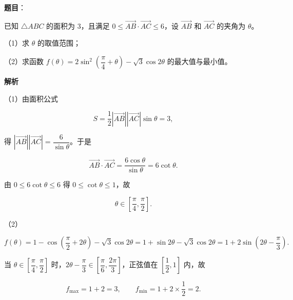 \begin{answer}

\textbf{题目}：

已知 $\triangle ABC$ 的面积为 $3$，且满足 $0\leqslant\overrightarrow{AB}\cdot\overrightarrow{AC}\leqslant6$，设 $\overrightarrow{AB}$ 和 $\overrightarrow{AC}$ 的夹角为 $\theta$。

（1）求 $\theta$ 的取值范围；

（2）求函数 $f(\theta)=2\sin^2\left(\dfrac{\pi}4+\theta\right)-\sqrt3\cos2\theta$ 的最大值与最小值。

\textbf{解析}

（1）由面积公式

\nopagebreak[4]
\[S=\frac12\left|\overrightarrow{AB}\right|\left|\overrightarrow{AC}\right|\sin\theta=3,\]

得 $\left|\overrightarrow{AB}\right|\left|\overrightarrow{AC}\right|=\dfrac6{\sin\theta}$。于是

\nopagebreak[4]
\[\overrightarrow{AB}\cdot\overrightarrow{AC}=\frac{6\cos\theta}{\sin\theta}=6\cot\theta.\]

由 $0\leqslant6\cot\theta\leqslant6$ 得 $0\leqslant\cot\theta\leqslant1$，故

\nopagebreak[4]
\[\theta\in\left[\frac{\pi}4,\frac{\pi}2\right].\]

（2）

\nopagebreak[4]
\[f(\theta)=1-\cos\left(\frac{\pi}2+2\theta\right)-\sqrt3\cos2\theta=1+\sin2\theta-\sqrt3\cos2\theta=1+2\sin\left(2\theta-\frac{\pi}3\right).\]

当 $\theta\in\left[\dfrac{\pi}4,\dfrac{\pi}2\right]$ 时，$2\theta-\dfrac{\pi}3\in\left[\dfrac{\pi}6,\dfrac{2\pi}3\right]$，正弦值在 $\left[\dfrac12,1\right]$ 内，故

\nopagebreak[4]
\[f_{\max}=1+2=3,\qquad f_{\min}=1+2\times\frac12=2.\]


\end{answer}
